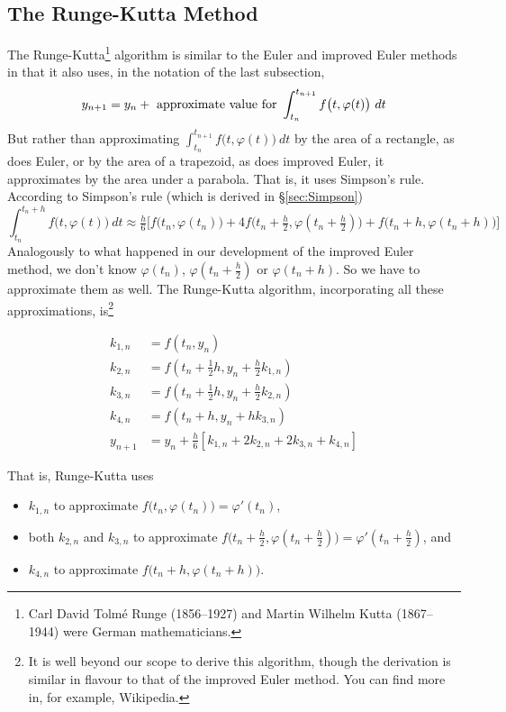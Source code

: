 \subsection{The Runge-Kutta Method}
The Runge-Kutta\footnote{Carl David Tolm\'e Runge (1856--1927) and
Martin Wilhelm Kutta (1867--1944) were German mathematicians.} algorithm is similar to the Euler and improved Euler methods
in that it also uses, in the notation of the last subsection,
\begin{equation*}
y_{n+1}=y_n+{\rm\ approximate\ value\ for \ }
\int_{t_n}^{t_{n+1}}f\big(t,\varphi(t)\big)\ dt
\end{equation*}
But rather than approximating $\int_{t_n}^{t_{n+1}}f\big(t,\varphi(t)\big)\ dt$
by the area of a rectangle, as does Euler, or by the area of a trapezoid,
as does improved Euler, it approximates by the area under a parabola.
That is, it uses Simpson's rule. According to Simpson's rule (which is 
derived in \S\ref{sec:Simpson})
\begin{equation*}
\int_{t_n}^{t_n+h}f\big(t,\varphi(t)\big)\ dt
\approx \tfrac{h}{6}\Big[f\big(t_n,\varphi(t_n)\big)
+4f\big(t_n+\tfrac{h}{2},\varphi(t_n+\tfrac{h}{2})\big)
+f\big(t_n+h,\varphi(t_n+h)\big)\Big]
\end{equation*}
Analogously to what happened in our development of the improved Euler method, 
we don't know $\varphi(t_n)$, $\varphi(t_n+\tfrac{h}{2})$ or
$\varphi(t_n+h)$. So we have to approximate them as well.
The Runge-Kutta algorithm, incorporating all these approximations, 
is\footnote{It is well beyond our scope to derive this algorithm, though the derivation is similar in flavour to that of the improved Euler method. You can find more in, for example, Wikipedia.}\goodbreak
\begin{impeqn}\label{RK}
\begin{align*}
k_{1,n}&=f(t_n,y_n) \\
k_{2,n}&=f(t_n+\tfrac{1}{2}h,y_n+\tfrac{h}{2}k_{1,n}) \\
k_{3,n}&=f(t_n+\tfrac{1}{2}h,y_n+\tfrac{h}{2}k_{2,n}) \\
k_{4,n}&=f(t_n+h,y_n+hk_{3,n}) \\
y_{n+1}&=y_n+\tfrac{h}{6}\left[k_{1,n}+2k_{2,n}+2k_{3,n}+k_{4,n}\right]
\end{align*}
\end{impeqn}
\noindent That is, Runge-Kutta uses 
\begin{itemize}\itemsep1pt \parskip0pt  %
\item 
     $k_{1,n}$ to approximate $f\big(t_n,\varphi(t_n)\big)=\varphi'(t_n)$,
\item  both $k_{2,n}$ and $k_{3,n}$ to approximate            
           $f\big(t_n+\tfrac{h}{2},\varphi(t_n+\tfrac{h}{2})\big)
               =\varphi'(t_n+\tfrac{h}{2})$, and
\item 
     $k_{4,n}$ to approximate $f\big(t_n+h,\varphi(t_n+h)\big)$.
\end{itemize}
